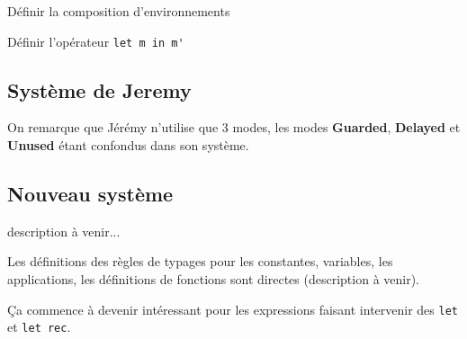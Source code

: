 \documentclass{article}
\begin{document}
Définir la composition d'environnements

Définir l'opérateur \verb&let m in m'&

\subsection*{Système de Jeremy}
On remarque que Jérémy n'utilise que 3 modes, les modes \textbf{Guarded}, \textbf{Delayed} et \textbf{Unused} étant confondus dans son système.

\subsection*{Nouveau système}
description à venir...

Les définitions des règles de typages pour les constantes, variables, les applications, les définitions de fonctions sont directes (description à venir).

Ça commence à devenir intéressant pour les expressions faisant intervenir des \verb&let& et \verb&let rec&.
\end{document}
